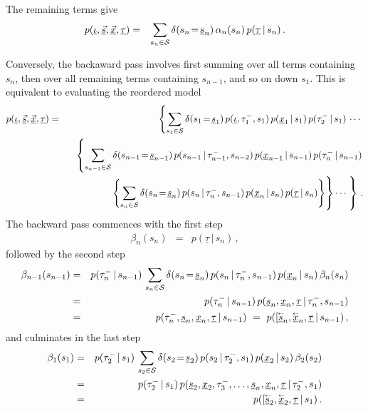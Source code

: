 \documentclass[a4paper]{article}
\newcommand{\rvec}[1]{\accentset{\leftarrow}{#1}}
\begin{document}
The remaining terms give
\begin{eqnarray}
   p(\underline{\iota},\underline{\vec{s}},\underline{\vec{x}},\underline{\tau}) 
& = & 
   \sum_{s_n\in{\cal S}}\delta(s_n\!=\!\underline{s}_n)\,\alpha_n(s_n)\,p(\underline{\tau}\,|\,s_n)\,.
\end{eqnarray}

Conversely, the backaward pass involves first summing over all terms containing $s_n$,
then over all remaining terms containing $s_{n-1}$, and so on down $s_1$.
This is equivalent to evaluating the reordered model
\begin{eqnarray}
   p(\underline{\iota},\underline{\vec{s}},\underline{\vec{x}},\underline{\tau}) 
& = & 
   \left\{\sum_{s_1\in{\cal S}}\delta(s_1\!=\!\underline{s}_1)\,
p(\underline{\iota},\tau^-_1,s_1)\,p(\underline{x}_1\,|\,s_1)\,p(\tau^-_2\,|\,s_1)\,
\cdots\right.
\nonumber\\&&
\;\;\;\left\{\sum_{s_{n-1}\in{\cal S}}\delta(s_{n-1}\!=\!\underline{s}_{n-1})\,
p(s_{n-1}\,|\,\tau^-_{n-1},s_{n-2})\,p(\underline{x}_{n-1}\,|\,s_{n-1})\,p(\tau^-_n\,|\,s_{n-1})\right.
\nonumber\\&&
\hspace*{4mm}
\left.\rule{0pt}{7mm}\left\{\sum_{s_n\in{\cal S}}\delta(s_n\!=\!\underline{s}_n)\,
p(s_n\,|\,\tau^-_n,s_{n-1})\,p(\underline{x}_{n}\,|\,s_n)
\,p(\underline{\tau}\,|\,s_n)\right\}\right\}
\cdots\left.\rule{0pt}{7mm}\right\}
\,.
\label{eq:backward}
\end{eqnarray}
The backward pass commences with the first step
\begin{eqnarray}
  \beta_n(s_n) & = & p(\underline{\tau}\,|\,s_n)\,,
\end{eqnarray}
followed by the second step
\begin{eqnarray}
  \beta_{n-1}(s_{n-1}) & = &
p(\tau^-_n\,|\,s_{n-1})\,\sum_{s_n\in{\cal S}}\delta(s_n\!=\!\underline{s}_n)\,
p(s_n\,|\,\tau^-_n,s_{n-1})\,p(\underline{x}_{n}\,|\,s_n)
\,\beta_n(s_n)
\nonumber\\&=&
p(\tau^-_n\,|\,s_{n-1})\,p(\underline{s}_n,\underline{x}_n,\underline{\tau}\,|\,\tau^-_n,s_{n-1})
\nonumber\\&=&
p(\tau^-_n,\underline{s}_n,\underline{x}_n,\underline{\tau}\,|\,s_{n-1})
~=~p([\underline{\rvec{s}}_n,\underline{\rvec{x}}_n,\underline{\tau}\,|\,s_{n-1})\,,
\end{eqnarray}
and culminates in the last step
\begin{eqnarray}
  \beta_{1}(s_{1}) & = &
p(\tau^-_2\,|\,s_{1})\,\sum_{s_2\in{\cal S}}\delta(s_2\!=\!\underline{s}_2)\,
p(s_2\,|\,\tau^-_2,s_{1})\,p(\underline{x}_{2}\,|\,s_2)
\,\beta_2(s_2)
\nonumber\\&=&
p(\tau^-_2\,|\,s_{1})\,
p(\underline{s}_2,\underline{x}_2,\tau^-_3,\ldots,\underline{s}_n,\underline{x}_n,\underline{\tau}\,|\,\tau^-_2,s_{1})
\nonumber\\&=&
p([\underline{\rvec{s}}_2,\underline{\rvec{x}}_2,\underline{\tau}\,|\,s_{1})\,.
\end{eqnarray}
\end{document}
